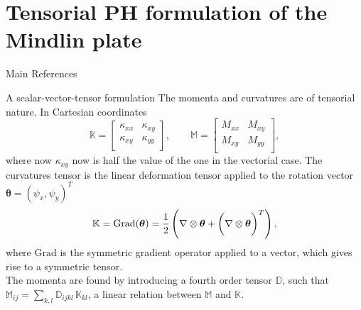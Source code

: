 \documentclass{beamer}
\newcommand{\tens}[1]{%
	\mathbin{\mathop{\otimes}\displaylimits_{#1}}%
}
\begin{document}
\section{Tensorial PH formulation of the Mindlin plate}

\begin{frame}{Main References}
\nobibliography*


\vspace{1cm}


\end{frame}

\begin{frame}{A scalar-vector-tensor formulation}
The momenta and curvatures are of tensorial nature. In Cartesian coordinates
\begin{equation*}
\mathbb{K} = 
\begin{bmatrix}
\kappa_{xx} &  \kappa_{xy}\\
\kappa_{xy} & \kappa_{yy} \\
\end{bmatrix}, \qquad
\mathbb{M}=
\begin{bmatrix}
M_{xx} & M_{xy} \\
M_{xy} & M_{yy} \\
\end{bmatrix},
\end{equation*}
where now $\kappa_{xy}$ now is half the value of the one in the vectorial case. The curvatures tensor is the linear deformation tensor applied to the rotation vector $\bm{\theta} = (\psi_x, \psi_y)^T$
\begin{equation*}
\mathbb{K} = \mathrm{Grad}(\bm{\theta}) =  \frac{1}{2} \left(\nabla \tens{} \bm{\theta} + \left(\nabla \tens{} \bm{\theta}\right)^T \right),
\end{equation*}
where $\mathrm{Grad}$ is the symmetric gradient operator applied to a vector, which gives rise to a symmetric tensor. \\
\vspace{1pt}
The momenta are found by introducing a fourth order tensor $\mathbb{D}$, such that $\mathbb{M}_{ij} = \sum_{k,l} \mathbb{D}_{ijkl} \, \mathbb{K}_{kl}$, a linear relation between $\mathbb{M}$ and $\mathbb{K}$.

\end{frame}
\end{document}
